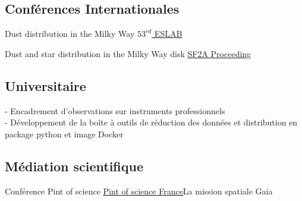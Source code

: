 \documentclass[
 a4paper, 10.5pt,
  sidebarwidth=0.32\paperwidth,
]{fortysecondscv}
\begin{document}
\subsection{Conférences Internationales}
\begin{cvtable}
  {Dust distribution in the Milky Way}
  {\href{https://ui.adsabs.harvard.edu/abs/2019gaia.confE..55H/abstract}{\underline{$53^{rd}$ ESLAB}}}
  {}

  {Dust and star distribution in the Milky Way disk}
  {\href{https://ui.adsabs.harvard.edu/\#abs/2018sf2a.conf..345H/abstract}{\underline{SF2A Proceeding}}}
  {}
\end{cvtable}

\subsection{Universitaire}
\begin{cvtable}
  
  {- Encadrement d'observations sur instruments professionnels\\
   - Développement de la boîte à outils de réduction des données et distribution en package
 python et image Docker}
\end{cvtable}

\subsection{Médiation scientifique}
\begin{cvtable}
  {Conférence Pint of science}
  {\href{https://pintofscience.fr/}{\underline{Pint of science France}}}{La mission spatiale Gaia}
\end{cvtable}
\end{document}
